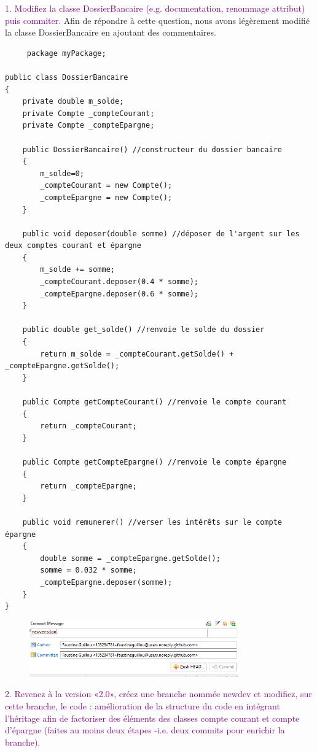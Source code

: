 \documentclass{article}
\begin{document}
\textcolor{Purple}{1. Modifiez la classe DossierBancaire (e.g. documentation, renommage attribut) puis commiter.}
\newline
Afin de répondre à cette question, nous avons légèrement modifié la classe DossierBancaire en ajoutant des commentaires.
\begin{lstlisting}
     package myPackage;

public class DossierBancaire
{	
	private double m_solde;
	private Compte _compteCourant;
	private Compte _compteEpargne;
	
    public DossierBancaire() //constructeur du dossier bancaire
    {
    	m_solde=0;
    	_compteCourant = new Compte();
    	_compteEpargne = new Compte();
    }

    public void deposer(double somme) //déposer de l'argent sur les deux comptes courant et épargne
    {
    	m_solde += somme;
    	_compteCourant.deposer(0.4 * somme);
    	_compteEpargne.deposer(0.6 * somme);
    }
    
    public double get_solde() //renvoie le solde du dossier
    {
    	return m_solde = _compteCourant.getSolde() + _compteEpargne.getSolde();
    }
    
    public Compte getCompteCourant() //renvoie le compte courant
    {
    	return _compteCourant;
    }
    
    public Compte getCompteEpargne() //renvoie le compte épargne
    {
    	return _compteEpargne;
    }
    
    public void remunerer() //verser les intérêts sur le compte épargne
    {
    	double somme = _compteEpargne.getSolde();
    	somme = 0.032 * somme;
    	_compteEpargne.deposer(somme);
    }
}
\end{lstlisting}
\begin{figure}[h]
\includegraphics[width=0.8\textwidth]{commit.png}
\end{figure}
\bigskip

\textcolor{Purple}{2. Revenez à la version «2.0», créez une branche nommée newdev et modifiez, sur cette branche, le code : amélioration de la structure du code en intégrant l’héritage afin de
factoriser des éléments des classes compte courant et compte d’épargne (faites au moins deux étapes -i.e. deux commits pour enrichir la branche).}
\newline
\end{document}
